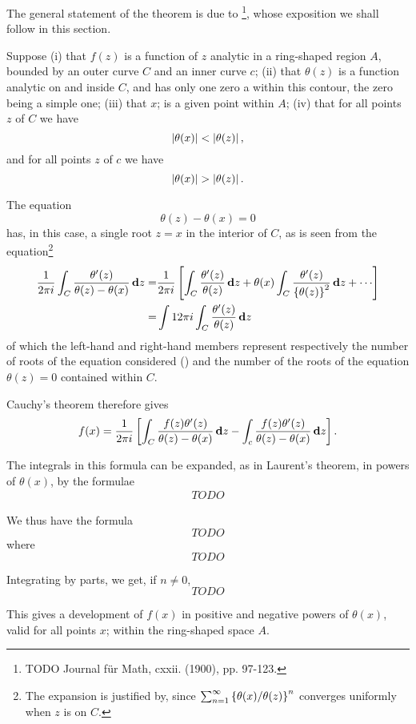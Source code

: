 The general statement of the theorem is due to
\Teixeira\footnote{TODO Journal f\"ur Math, cxxii. (1900), pp.
  97-123.}, whose exposition we shall follow in this section.

Suppose (i) that $f(z)$ is a function of $z$ analytic in a ring-shaped
region $A$, bounded by an outer curve $C$ and an inner curve $c$;
(ii) that $\theta(z)$ is a function analytic on and inside $C$,
and has only one zero a
within this contour, the zero being a simple one;
(iii) that $x$; is a given point within $A$;
(iv) that for all points $z$ of $C$ we have
$$
\left| \theta(x) \right| < \left| \theta(z) \right|,
$$
and for all points $z$ of $c$ we have
$$
\left| \theta(x) \right| > \left| \theta(z) \right|.
$$

The equation
$$
\theta(z) - \theta(x) = 0
$$
has, in this case, a single root $z = x$ in the interior of $C$, as is
seen from the equation\footnote{The expansion is justified
  by, since
  $\sum_{n=1}^{\infty} \left\{ \theta(x)/\theta(z) \right\}^{n}$
  converges uniformly when $z$
  is on $C$.}
\begin{align*}
  \frac{1}{2 \pi i}
  \int_{C} \frac{\theta'(z)}{\theta(z) - \theta(x)} \dmeasure z
  =&
  \frac{1}{2 \pi i}
  \thebracket{
    \int_{C} \frac{\theta'(z)}{\theta(z)} \dmeasure z
    +
    \theta(x)
    \int_{C} \frac{\theta'(z)}{ \thebrace{\theta(z)}^{2}}
    \dmeasure z
    + \cdots
  }
  \\
  =&
  \int{1}{2 \pi i}
  \int_{C} \frac{\theta'(z)}{\theta(z)} \dmeasure z
\end{align*}
of which the left-hand and right-hand members represent respectively
the number of roots of the equation considered
() and the
number of the roots of the equation $\theta(z) = 0$ contained within
$C$.

Cauchy's theorem therefore gives
$$
f(x)
=
\frac{1}{2 \pi i}
\left[ 
  \int_{C} \frac{f(z) \theta'(z)}{\theta(z) - \theta(x)} \, \mathbf{d} z
  -
  \int_{c} \frac{f(z) \theta'(z)}{\theta(z) - \theta(x)} \, \mathbf{d} z
 \right].
$$

%
%
The integrals in this formula can be expanded, as in Laurent's
theorem, in powers of $\theta(x)$, by the formulae
\begin{align*}
  TODO
\end{align*}

We thus have the formula
$$
TODO
$$
where
$$
TODO
$$

Integrating by parts, we get, if $n \neq 0$,
$$
TODO
$$

This gives a development of $f(x)$ in positive and negative powers of
$\theta(x)$, valid for all points $x$; within the ring-shaped space $A$.

